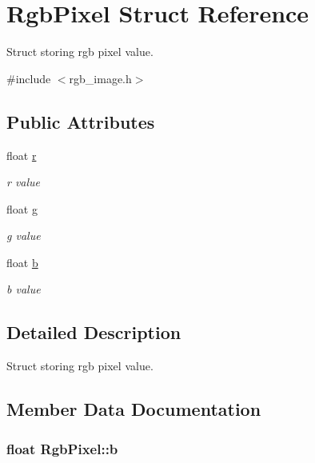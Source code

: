 \hypertarget{structRgbPixel}{}\section{Rgb\+Pixel Struct Reference}
\label{structRgbPixel}


Struct storing rgb pixel value.  




{\ttfamily \#include $<$rgb\+\_\+image.\+h$>$}

\subsection*{Public Attributes}
\begin{DoxyCompactItemize}
\item 
float \hyperlink{structRgbPixel_a67af5b5d33223136bfd0e1d1b275b4b9}{r}
\begin{DoxyCompactList}\small\item\em r value \end{DoxyCompactList}\item 
float \hyperlink{structRgbPixel_aced4cb24a07aa249bb29ff0d496e0c4a}{g}
\begin{DoxyCompactList}\small\item\em g value \end{DoxyCompactList}\item 
float \hyperlink{structRgbPixel_a29a46a65fb9035c089e7be3c72503bcf}{b}
\begin{DoxyCompactList}\small\item\em b value \end{DoxyCompactList}\end{DoxyCompactItemize}


\subsection{Detailed Description}
Struct storing rgb pixel value. 

\subsection{Member Data Documentation}
\hypertarget{structRgbPixel_a29a46a65fb9035c089e7be3c72503bcf}{}
\subsubsection[{b}]{\setlength{\rightskip}{0pt plus 5cm}float Rgb\+Pixel\+::b}\label{structRgbPixel_a29a46a65fb9035c089e7be3c72503bcf}


